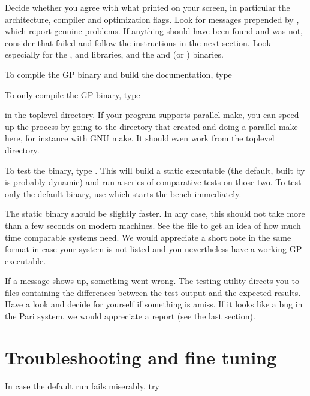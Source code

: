 Decide whether you agree with what  printed on your screen, in
particular the architecture, compiler and optimization flags. Look for
messages prepended by \kbd{\#\#\#}, which report genuine problems. If
anything should have been found and was not, consider that 
failed and follow the instructions in the next section. Look especially for
the ,  and  libraries, and the  and
 (or ) binaries.

 To compile the GP binary and build the
documentation, type


\noindent To only compile the GP binary, type


\noindent in the toplevel directory. If your  program supports
parallel make, you can speed up the process by going to the 
directory that  created and doing a parallel make here, for
instance  with GNU make. It should even work from the toplevel
directory.


To test the binary, type . This will build a static
executable (the default, built by  is probably dynamic) and
run a series of comparative tests on those two. To test only the default
binary, use  which starts the bench immediately.

The static binary should be slightly faster. In any case, this should not
take more than a few seconds on modern machines. See the file
 to get an idea of how much time comparable systems need.
We would appreciate a short note in the same format in case your system is
not listed and you nevertheless have a working GP executable.

If a \kbd{[BUG]} message shows up, something went wrong. The testing utility
directs you to files containing the differences between the test output and
the expected results. Have a look and decide for yourself if something is
amiss. If it looks like a bug in the Pari system, we would appreciate a
report (see the last section).

\section{Troubleshooting and fine tuning} 
In case the default  run fails miserably, try

